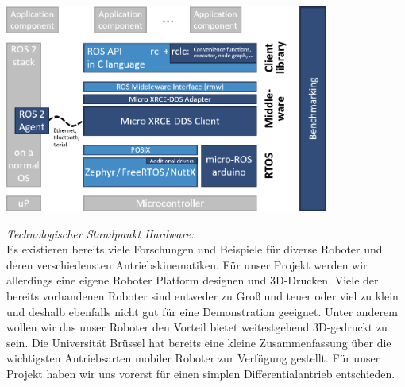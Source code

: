 \begin{flushleft}
\begin{description}
        \includegraphics[width=0.8\textwidth]{imgs/Grundbegriffe/micro-ROS_architecture.png}
        \label{fig:micro-ros-architecture}%
            
    \end{description}
\end{flushleft}

\begin{flushleft}
    \textit{Technologischer Standpunkt Hardware:} \\
    Es existieren bereits viele Forschungen und Beispiele für diverse Roboter
    und deren verschiedensten Antriebskinematiken.
    Für unser Projekt werden wir allerdings eine eigene Roboter Platform designen und 3D-Drucken.
    Viele der bereits vorhandenen Roboter sind entweder zu Groß und teuer oder viel zu klein und deshalb ebenfalls nicht 
    gut für eine Demonstration geeignet. Unter anderem wollen wir das unser Roboter den Vorteil bietet weitestgehend
    3D-gedruckt zu sein.
    Die Universität Brüssel \cite{brussel_kristof_goris} hat bereits eine kleine Zusammenfassung über die wichtigsten Antriebsarten mobiler Roboter zur Verfügung gestellt.
    Für unser Projekt haben wir uns vorerst für einen simplen Differentialantrieb entschieden. 
\end{flushleft}